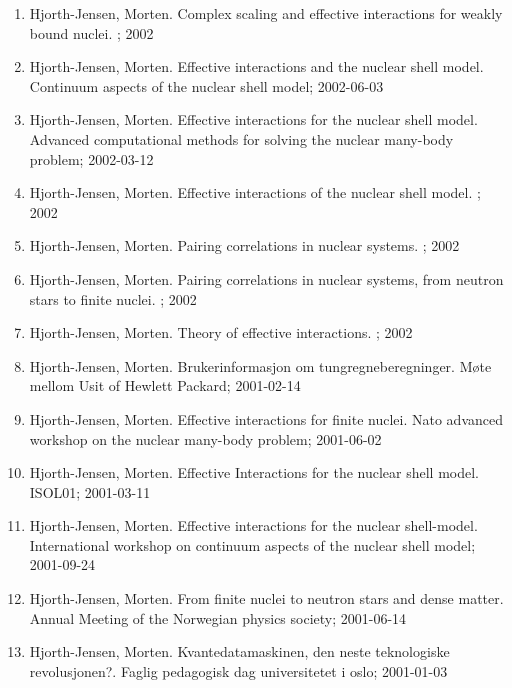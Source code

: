 \documentclass[a4wide,10pt]{article}
\begin{document}
\begin{enumerate}
\item Hjorth-Jensen, Morten. Complex scaling and effective interactions for weakly bound nuclei. ; 2002

\item Hjorth-Jensen, Morten. Effective interactions and the nuclear shell model. Continuum aspects of the nuclear shell model; 2002-06-03

\item Hjorth-Jensen, Morten. Effective interactions for the nuclear shell model. Advanced computational methods for solving the nuclear many-body problem; 2002-03-12

\item Hjorth-Jensen, Morten. Effective interactions of the nuclear shell model. ; 2002

\item Hjorth-Jensen, Morten. Pairing correlations in nuclear systems. ; 2002

\item Hjorth-Jensen, Morten. Pairing correlations in nuclear systems, from neutron stars to finite nuclei. ; 2002

\item Hjorth-Jensen, Morten. Theory of effective interactions. ; 2002

\item Hjorth-Jensen, Morten. Brukerinformasjon om tungregneberegninger. Møte mellom Usit of Hewlett Packard; 2001-02-14

\item Hjorth-Jensen, Morten. Effective interactions for finite nuclei. Nato advanced workshop on the nuclear many-body problem; 2001-06-02

\item Hjorth-Jensen, Morten. Effective Interactions for the nuclear shell model. ISOL01; 2001-03-11

\item Hjorth-Jensen, Morten. Effective interactions for the nuclear shell-model. International workshop on continuum aspects of the nuclear shell model; 2001-09-24

\item Hjorth-Jensen, Morten. From finite nuclei to neutron stars and dense matter. Annual Meeting of the Norwegian physics society; 2001-06-14

\item Hjorth-Jensen, Morten. Kvantedatamaskinen, den neste teknologiske revolusjonen?. Faglig pedagogisk dag universitetet i oslo; 2001-01-03


\end{enumerate}
\end{document}

